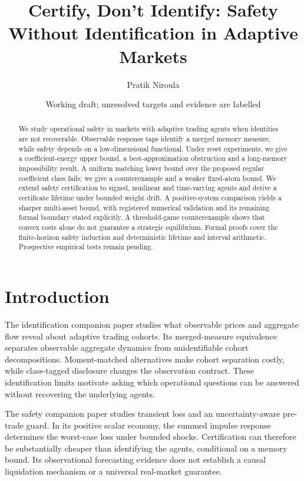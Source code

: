 \documentclass[11pt]{article}
\theoremstyle{definition}
\theoremstyle{remark}
\begin{document}
\title{Certify, Don't Identify: Safety Without Identification in Adaptive Markets}
\author{Pratik Niroula}
\date{Working draft; unresolved targets and evidence are labelled}
\maketitle
\begin{abstract}
We study operational safety in markets with adaptive trading agents when identities are not recoverable. Observable response taps identify a merged memory measure, while safety depends on a low-dimensional functional. Under reset experiments, we give a coefficient-energy upper bound, a best-approximation obstruction and a long-memory impossibility result. A uniform matching lower bound over the proposed regular coefficient class fails; we give a counterexample and a weaker fixed-atom bound. We extend safety certification to signed, nonlinear and time-varying agents and derive a certificate lifetime under bounded weight drift. A positive-system comparison yields a sharper multi-asset bound, with registered numerical validation and its remaining formal boundary stated explicitly. A threshold-game counterexample shows that convex costs alone do not guarantee a strategic equilibrium. Formal proofs cover the finite-horizon safety induction and deterministic lifetime and interval arithmetic. Prospective empirical tests remain pending.
\end{abstract}
\section{Introduction}
The identification companion paper \citep{p3:paper1} studies what observable prices and aggregate flow reveal about adaptive trading cohorts. Its merged-measure equivalence separates observable aggregate dynamics from unidentifiable cohort decompositions. Moment-matched alternatives make cohort separation costly, while class-tagged disclosure changes the observation contract. These identification limits motivate asking which operational questions can be answered without recovering the underlying agents.

The safety companion paper \citep{p3:paper2} studies transient loss and an uncertainty-aware pre-trade guard. In its positive scalar economy, the summed impulse response determines the worst-case loss under bounded shocks. Certification can therefore be substantially cheaper than identifying the agents, conditional on a memory bound. Its observational forecasting evidence does not establish a causal liquidation mechanism or a universal real-market guarantee.
\end{document}
